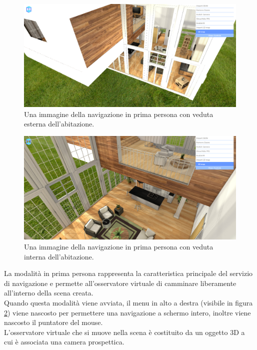 \begin{figure}[htb]
 \centering
 \includegraphics[width=1\linewidth]{images/chapter_navigazione_scena/navigator_est.png}\hfill
 \caption[Navigazione dall'alto: veduta esterna]{Una immagine della navigazione in prima persona con veduta esterna dell'abitazione.}
 \label{fig:navigazione_scena_navigator_est}
\end{figure}
\begin{figure}[htb]
 \centering
 \includegraphics[width=1\linewidth]{images/chapter_navigazione_scena/navigator_int.png}\hfill
 \caption[Navigazione dall'alto: veduta esterna]{Una immagine della navigazione in prima persona con veduta interna dell'abitazione.}
 \label{fig:navigazione_scena_navigator_int}
\end{figure}
La modalità in prima persona rappresenta la caratteristica principale del servizio di navigazione e permette all’osservatore virtuale di camminare liberamente all’interno della scena creata.
\\
Quando questa modalità viene avviata, il menu in alto a destra (visibile in figura \ref{fig:navigazione_scena_navigator_int}) viene nascosto per permettere una navigazione a schermo intero, inoltre viene nascosto il puntatore del mouse.
\\
L’osservatore virtuale che si muove nella scena è costituito da un oggetto 3D a cui è associata una camera prospettica.

